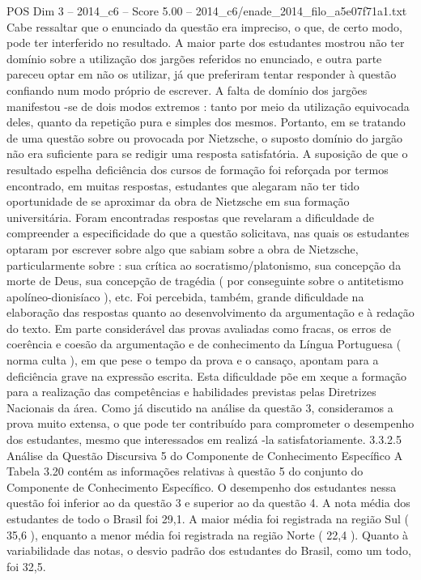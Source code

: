 \begin{textsample}{POS Dim 3 – 2014\_c6 – Score 5.00 – 2014\_c6/enade\_2014\_filo\_a5e07f71a1.txt}
Cabe ressaltar que o enunciado da questão era impreciso, o que, de certo modo, pode ter interferido no resultado.
A maior parte dos estudantes mostrou não ter domínio sobre a utilização dos jargões referidos no enunciado, e outra parte pareceu optar em não os utilizar, já que preferiram tentar responder à questão confiando num modo próprio de escrever.
A falta de domínio dos jargões manifestou -se de dois modos extremos : tanto por meio da utilização equivocada deles, quanto da repetição pura e simples dos mesmos.
Portanto, em se tratando de uma questão sobre ou provocada por Nietzsche, o suposto domínio do jargão não era suficiente para se redigir uma resposta satisfatória.
A suposição de que o resultado espelha deficiência dos cursos de formação foi reforçada por termos encontrado, em muitas respostas, estudantes que alegaram não ter tido oportunidade de se aproximar da obra de Nietzsche em sua formação universitária.
Foram encontradas respostas que revelaram a dificuldade de compreender a especificidade do que a questão solicitava, nas quais os estudantes optaram por escrever sobre algo que sabiam sobre a obra de Nietzsche, particularmente sobre : sua crítica ao socratismo/platonismo, sua concepção da morte de Deus, sua concepção de tragédia ( por conseguinte sobre o antitetismo apolíneo-dionisíaco ), etc.
Foi percebida, também, grande dificuldade na elaboração das respostas quanto ao desenvolvimento da argumentação e à redação do texto.
Em parte considerável das provas avaliadas como fracas, os erros de coerência e coesão da argumentação e de conhecimento da Língua Portuguesa ( norma culta ), em que pese o tempo da prova e o cansaço, apontam para a deficiência grave na expressão escrita.
Esta dificuldade põe em xeque a formação para a realização das competências e habilidades previstas pelas Diretrizes Nacionais da área.
Como já discutido na análise da questão 3, consideramos a prova muito extensa, o que pode ter contribuído para comprometer o desempenho dos estudantes, mesmo que interessados em realizá -la satisfatoriamente. 3.3.2.5 Análise da Questão Discursiva 5 do Componente de Conhecimento Específico A Tabela 3.20 contém as informações relativas à questão 5 do conjunto do Componente de Conhecimento Específico.
O desempenho dos estudantes nessa questão foi inferior ao da questão 3 e superior ao da questão 4.
A nota média dos estudantes de todo o Brasil foi 29,1.
A maior média foi registrada na região Sul ( 35,6 ), enquanto a menor média foi registrada na região Norte ( 22,4 ).
Quanto à variabilidade das notas, o desvio padrão dos estudantes do Brasil, como um todo, foi 32,5.

\end{textsample}
